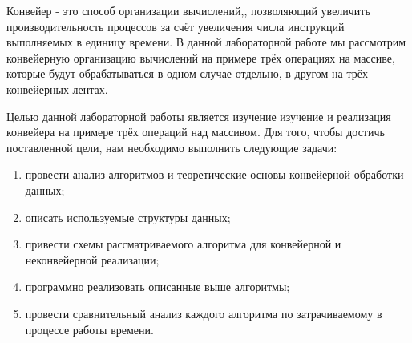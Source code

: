 \Introduction
Конвейер - это способ организации вычислений,, позволяющий увеличить производительность процессов за счёт увеличения числа инструкций выполняемых в единицу времени. В данной лабораторной работе мы рассмотрим конвейерную организацию вычислений на примере трёх операциях на массиве, которые будут обрабатываться в одном случае отдельно, в другом на трёх конвейерных лентах.

Целью данной лабораторной работы является изучение изучение и реализация конвейера на примере трёх операций над массивом. Для того, чтобы достичь поставленной цели, нам необходимо выполнить следующие задачи:

\begin{enumerate}
	\item провести анализ алгоритмов и теоретические основы конвейерной обработки данных;
	\item описать используемые структуры данных;
	\item привести схемы рассматриваемого алгоритма для конвейерной и неконвейерной реализации;
	\item программно реализовать описанные выше алгоритмы;
	\item провести сравнительный анализ каждого алгоритма по затрачиваемому в процессе работы времени.
\end{enumerate}
